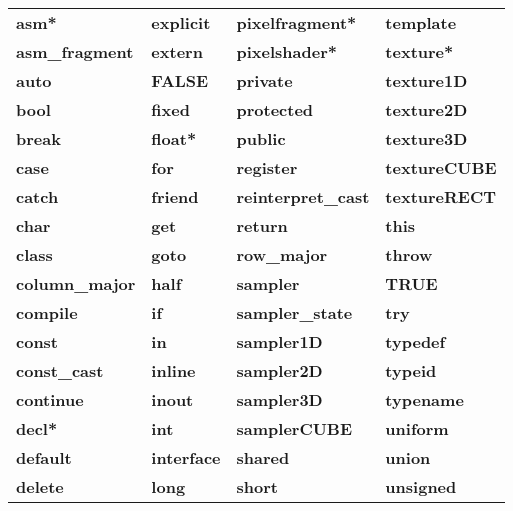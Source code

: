 \documentclass[../main.tex]{subfiles}
\begin{document}
\begin{table}
\centering
\begin{tabular}{ p{4cm} p{4cm} p{4cm} p{4cm}  } 

\textbf{asm*}             & \textbf{explicit}          & \textbf{pixelfragment*}      & \textbf{template} \\
\textbf{asm_fragment}     & \textbf{extern}            & \textbf{pixelshader*}        & \textbf{texture*} \\
\textbf{auto}             & \textbf{FALSE}             & \textbf{private}             & \textbf{texture1D} \\
\textbf{bool}             & \textbf{fixed}             & \textbf{protected}           & \textbf{texture2D} \\
\textbf{break}            & \textbf{float*}            & \textbf{public}              & \textbf{texture3D} \\
\textbf{case}             & \textbf{for}               & \textbf{register}            & \textbf{textureCUBE} \\
\textbf{catch}            & \textbf{friend}            & \textbf{reinterpret_cast}    & \textbf{textureRECT} \\
\textbf{char}             & \textbf{get}               & \textbf{return}              & \textbf{this} \\
\textbf{class}            & \textbf{goto}              & \textbf{row_major}           & \textbf{throw} \\
\textbf{column_major}     & \textbf{half}              & \textbf{sampler}             & \textbf{TRUE} \\
\textbf{compile}          & \textbf{if}                & \textbf{sampler_state}       & \textbf{try} \\
\textbf{const}            & \textbf{in}                & \textbf{sampler1D}           & \textbf{typedef} \\
\textbf{const_cast}       & \textbf{inline}            & \textbf{sampler2D}           & \textbf{typeid} \\
\textbf{continue}         & \textbf{inout}             & \textbf{sampler3D}           & \textbf{typename} \\
\textbf{decl*}            & \textbf{int}               & \textbf{samplerCUBE}         & \textbf{uniform} \\
\textbf{default}          & \textbf{interface}         & \textbf{shared}              & \textbf{union} \\
\textbf{delete}           & \textbf{long}              & \textbf{short}               & \textbf{unsigned} \\

\end{tabular}
\end{table}
\end{document}
